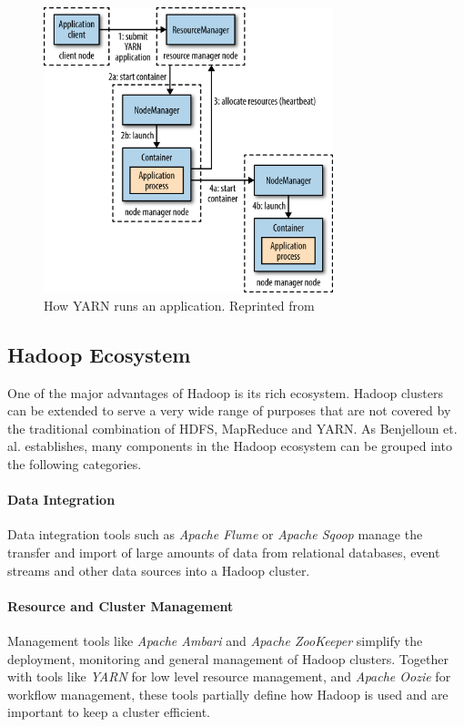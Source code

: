 \begin{figure}[th]
     {\centering\includegraphics[width=0.75\textwidth]{img/hddg_0402.png}\par}
	\caption{\label{fig:yarn}How YARN runs an application. Reprinted from \autocite[][Chap.~4]{white2015hadoop}}
\end{figure}


\subsection{Hadoop Ecosystem}
\label{hadoop-ecosystem}

One of the major advantages of Hadoop is its rich ecosystem. 
Hadoop clusters can be extended to serve a very wide range of purposes 
that are not covered by the traditional combination of \ac{HDFS}, MapReduce and \ac{YARN}.
As Benjelloun et. al. establishes, many components in the Hadoop ecosystem 
can be grouped into the following categories.\autocite{7105553}

\paragraph{Data Integration}
Data integration tools such as \emph{Apache Flume} or \emph{Apache Sqoop} manage the transfer 
and import of large amounts of data from relational databases\autocite{apache2018sqoop}, 
event streams and other data sources\autocite{apache2017flume} into a Hadoop cluster.

\paragraph{Resource and Cluster Management}
Management tools like \emph{Apache Ambari} and \emph{Apache ZooKeeper} simplify the deployment, 
monitoring and general management of Hadoop clusters. 
Together with tools like \emph{\ac{YARN}} for low level resource management, 
and \emph{Apache Oozie} for workflow management, these tools partially define how Hadoop is used 
and are important to keep a cluster efficient.

